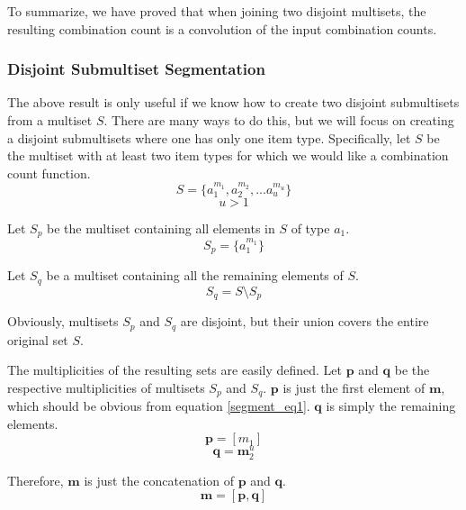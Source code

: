 \documentclass{article}
\begin{document}
To summarize, we have proved that when joining two disjoint multisets, the resulting combination count is a convolution of the input combination counts.

\subsubsection{Disjoint Submultiset Segmentation} \label{segment}

The above result is only useful if we know how to create two disjoint submultisets from a multiset $S$. There are many ways to do this, but we will focus on creating a disjoint submultisets where one has only one item type. Specifically, let $S$ be the multiset with at least two item types for which we would like a combination count function. 
\begin{equation}
    S = \{a_1^{m_1}, a_2^{m_2}, ... a_u^{m_u}\}
\end{equation}
\begin{equation}
    u>1
\end{equation}

Let $S_p$ be the multiset containing all elements in $S$ of type $a_1$.
\begin{equation} \label{segment_eq1}
    S_p = \{a_1^{m_1}\}
\end{equation}

Let $S_q$ be a multiset containing all the remaining elements of $S$.
\begin{equation}
    S_q = S \setminus S_p
\end{equation}

Obviously, multisets $S_p$ and $S_q$ are disjoint, but their union covers the entire original set $S$.

The multiplicities of the resulting sets are easily defined. Let $\bm{p}$ and $\bm{q}$ be the respective multiplicities of multisets $S_p$ and $S_q$. $\bm{p}$ is just the first element of $\bm{m}$, which should be obvious from equation \ref{segment_eq1}. $\bm{q}$ is simply the remaining elements.
\begin{equation}
    \bm{p} = [m_1]
\end{equation}
\begin{equation}
    \bm{q} = \bm{m}_2^u
\end{equation}

Therefore, $\bm{m}$ is just the concatenation of $\bm{p}$ and $\bm{q}$.
\begin{equation}
    \bm{m} = [\bm{p}, \bm{q}]
\end{equation}
\end{document}
